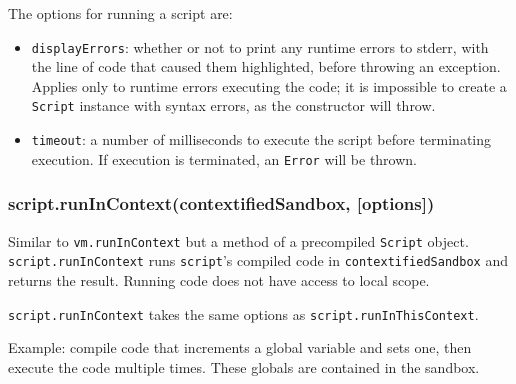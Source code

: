 The options for running a script are:

\begin{itemize}
\itemsep1pt\parskip0pt
\item
  \texttt{displayErrors}: whether or not to print any runtime errors to
  stderr, with the line of code that caused them highlighted, before
  throwing an exception. Applies only to runtime errors executing the
  code; it is impossible to create a \texttt{Script} instance with
  syntax errors, as the constructor will throw.
\item
  \texttt{timeout}: a number of milliseconds to execute the script
  before terminating execution. If execution is terminated, an
  \texttt{Error} will be thrown.
\end{itemize}

\subsubsection{script.runInContext(contextifiedSandbox,
{[}options{]})}\label{script.runincontextcontextifiedsandbox-options}

Similar to \texttt{vm.runInContext} but a method of a precompiled
\texttt{Script} object. \texttt{script.runInContext} runs
\texttt{script}'s compiled code in \texttt{contextifiedSandbox} and
returns the result. Running code does not have access to local scope.

\texttt{script.runInContext} takes the same options as
\texttt{script.runInThisContext}.

Example: compile code that increments a global variable and sets one,
then execute the code multiple times. These globals are contained in the
sandbox.

\begin{Shaded}
\begin{Highlighting}[]
 \NormalTok{(}\NormalTok{);}
 \NormalTok{(}\NormalTok{);}

 
  \NormalTok{: }\NormalTok{,}
  \NormalTok{: }
\NormalTok{\};}

  \NormalTok{(}\NormalTok{);}

 \NormalTok{(} 
\NormalTok{\}}

\NormalTok{(}

\end{Highlighting}
\end{Shaded}

